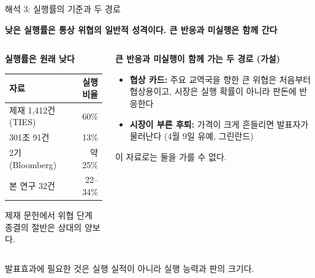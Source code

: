 \documentclass[aspectratio=169,9pt,t]{beamer}
\newcommand{\msg}[1]{{\fontsize{11.5}{15}\selectfont\bfseries\color{navy}\RaggedRight #1\par}\vspace{2.0mm}}
\newcommand{\takeaway}[1]{%
  \par\vfill
  \noindent\colorbox{wash}{\begin{minipage}[c]{\dimexpr\linewidth-2\fboxsep\relax}\vspace{0.5mm}\hspace{1.5mm}{\color{crim}\bfseries$\rightarrow$}\hspace{1.5mm}%
  \begin{minipage}[c]{\dimexpr\linewidth-9mm\relax}\fontsize{8.6}{11}\selectfont\RaggedRight #1\end{minipage}\vspace{0.5mm}\end{minipage}}\par\vspace{0.8mm}}
\newcommand{\lab}[1]{{\fontsize{8.4}{10.5}\selectfont\bfseries\color{crim}#1}}
\newcommand{\tf}{\fontsize{8.2}{10.4}\selectfont}
\begin{document}
\begin{frame}{해석 3: 실행률의 기준과 두 경로}
\msg{낮은 실행률은 통상 위협의 일반적 성격이다. 큰 반응과 미실행은 함께 간다}
\begin{columns}[t,onlytextwidth]
\begin{column}{0.44\textwidth}
\lab{실행률은 원래 낮다}
\begingroup\tf
\begin{tabularx}{\linewidth}{@{}Yr@{}}
\toprule
자료 & 실행 비율\\
\midrule
제재 1,412건 (TIES) & 60\%\\
301조 91건 & 13\%\\
2기 (Bloomberg) & 약 25\%\\
본 연구 32건 & 22--34\%\\
\bottomrule
\end{tabularx}\endgroup
\vspace{1.5mm}
{\small\RaggedRight 제재 문헌에서 위협 단계 종결의 절반은 상대의 양보다.\par}
\end{column}
\begin{column}{0.52\textwidth}
\lab{큰 반응과 미실행이 함께 가는 두 경로 (가설)}
\begin{itemize}
\item \textbf{협상 카드:} 주요 교역국을 향한 큰 위협은 처음부터 협상용이고, 시장은 실행 확률이 아니라 판돈에 반응한다
\item \textbf{시장이 부른 후퇴:} 가격이 크게 흔들리면 발표자가 물러난다 (4월 9일 유예, 그린란드)
\end{itemize}
{\small\RaggedRight 이 자료로는 둘을 가를 수 없다.\par}
\end{column}
\end{columns}
\takeaway{발표효과에 필요한 것은 실행 실적이 아니라 실행 능력과 판의 크기다.}
\end{frame}
\end{document}
